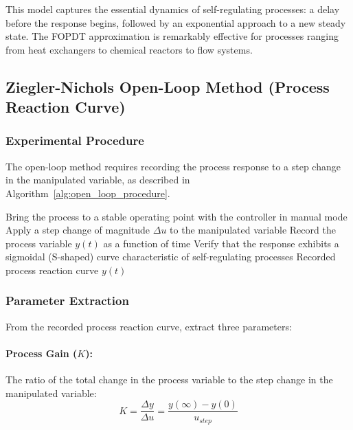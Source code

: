 This model captures the essential dynamics of self-regulating processes: a delay before the response begins, followed by an exponential approach to a new steady state. The FOPDT approximation is remarkably effective for processes ranging from heat exchangers to chemical reactors to flow systems.

\subsection{Ziegler-Nichols Open-Loop Method (Process Reaction Curve)}

\subsubsection{Experimental Procedure}

The open-loop method requires recording the process response to a step change in the manipulated variable, as described in Algorithm~\ref{alg:open_loop_procedure}.

\begin{algorithm}
\caption{Ziegler-Nichols Open-Loop Experimental Procedure}
\label{alg:open_loop_procedure}
\begin{algorithmic}[1]
\State Bring the process to a stable operating point with the controller in manual mode
\State Apply a step change of magnitude $\Delta u$ to the manipulated variable
\State Record the process variable $y(t)$ as a function of time
\State Verify that the response exhibits a sigmoidal (S-shaped) curve characteristic of self-regulating processes
\State \Return Recorded process reaction curve $y(t)$
\end{algorithmic}
\end{algorithm}

\subsubsection{Parameter Extraction}

From the recorded process reaction curve, extract three parameters:

\paragraph{Process Gain ($K$):}
The ratio of the total change in the process variable to the step change in the manipulated variable:
\begin{equation}
    K = \frac{\Delta y}{\Delta u} = \frac{y(\infty) - y(0)}{u_{step}}
\end{equation}

